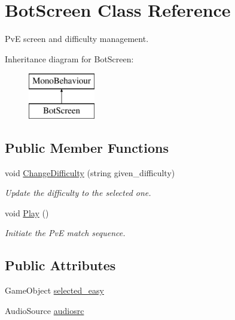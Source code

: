 \hypertarget{class_bot_screen}{}\section{Bot\+Screen Class Reference}
\label{class_bot_screen}


PvE screen and difficulty management.  


Inheritance diagram for Bot\+Screen\+:\begin{figure}[H]
\begin{center}
\leavevmode
\includegraphics[height=2.000000cm]{class_bot_screen}
\end{center}
\end{figure}
\subsection*{Public Member Functions}
\begin{DoxyCompactItemize}
\item 
void \mbox{\hyperlink{class_bot_screen_a0d4926b1ac8cb0e45f72b127cd297f94}{Change\+Difficulty}} (string given\+\_\+difficulty)
\begin{DoxyCompactList}\small\item\em Update the difficulty to the selected one. \end{DoxyCompactList}\item 
void \mbox{\hyperlink{class_bot_screen_a594089f360bedf3ae9aff037401a504c}{Play}} ()
\begin{DoxyCompactList}\small\item\em Initiate the PvE match sequence. \end{DoxyCompactList}\end{DoxyCompactItemize}
\subsection*{Public Attributes}
\begin{DoxyCompactItemize}
\item 
Game\+Object \mbox{\hyperlink{class_bot_screen_a6bfbc4fa0fb32c1eaddab0d8f4a696a7}{selected\+\_\+easy}}
\item 
Audio\+Source \mbox{\hyperlink{class_bot_screen_ad005dc3b790b271432c1a7146acd1057}{audiosrc}}
\end{DoxyCompactItemize}
